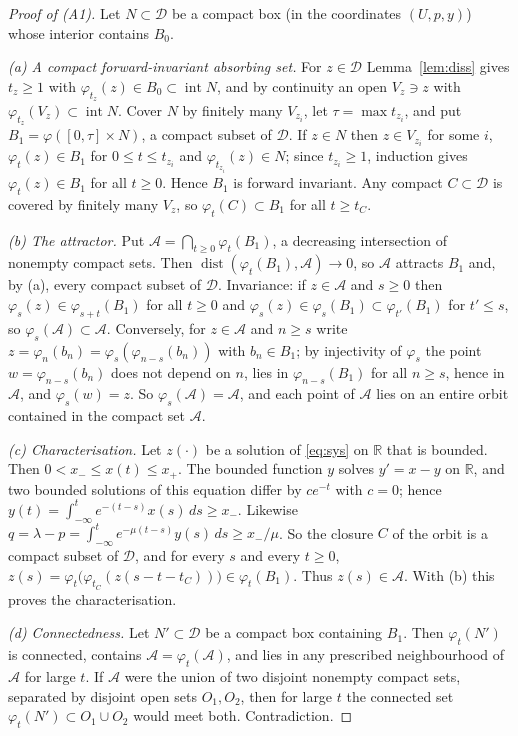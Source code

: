 \documentclass[11pt,a4paper]{article}
\numberwithin{equation}{section}
\theoremstyle{remark}\newtheorem{remark}[theorem]{Remark}
\newcommand{\R}{\mathbb R}
\newcommand{\cA}{\mathcal A}
\newcommand{\cD}{\mathcal D}
\DeclareMathOperator{\inter}{int}
\begin{document}
\begin{proof}[Proof of (A1)]
Let $N\subset\cD$ be a compact box (in the coordinates $(U,p,y)$) whose interior contains $B_0$.

\emph{(a) A compact forward-invariant absorbing set.} For $z\in\cD$ Lemma~\ref{lem:diss} gives $t_z\ge1$ with
$\varphi_{t_z}(z)\in B_0\subset\inter N$, and by continuity an open $V_z\ni z$ with
$\varphi_{t_z}(V_z)\subset\inter N$. Cover $N$ by finitely many $V_{z_i}$, let $\tau=\max t_{z_i}$, and put
$B_1=\varphi([0,\tau]\times N)$, a compact subset of $\cD$. If $z\in N$ then $z\in V_{z_i}$ for some $i$,
$\varphi_t(z)\in B_1$ for $0\le t\le t_{z_i}$ and $\varphi_{t_{z_i}}(z)\in N$; since $t_{z_i}\ge1$, induction gives
$\varphi_t(z)\in B_1$ for all $t\ge0$. Hence $B_1$ is forward invariant. Any compact $C\subset\cD$ is covered by
finitely many $V_z$, so $\varphi_t(C)\subset B_1$ for all $t\ge t_C$.

\emph{(b) The attractor.} Put $\cA=\bigcap_{t\ge0}\varphi_t(B_1)$, a decreasing intersection of nonempty compact
sets. Then $\operatorname{dist}(\varphi_t(B_1),\cA)\to0$, so $\cA$ attracts $B_1$ and, by (a), every compact subset
of $\cD$. Invariance: if $z\in\cA$ and $s\ge0$ then $\varphi_s(z)\in\varphi_{s+t}(B_1)$ for all $t\ge0$ and
$\varphi_s(z)\in\varphi_s(B_1)\subset\varphi_{t'}(B_1)$ for $t'\le s$, so $\varphi_s(\cA)\subset\cA$. Conversely,
for $z\in\cA$ and $n\ge s$ write $z=\varphi_n(b_n)=\varphi_s(\varphi_{n-s}(b_n))$ with $b_n\in B_1$; by injectivity
of $\varphi_s$ the point $w=\varphi_{n-s}(b_n)$ does not depend on $n$, lies in $\varphi_{n-s}(B_1)$ for all
$n\ge s$, hence in $\cA$, and $\varphi_s(w)=z$. So $\varphi_s(\cA)=\cA$, and each point of $\cA$ lies on an entire
orbit contained in the compact set $\cA$.

\emph{(c) Characterisation.} Let $z(\cdot)$ be a solution of \eqref{eq:sys} on $\R$ that is bounded. Then
$0<x_-\le x(t)\le x_+$. The bounded function $y$ solves $y'=x-y$ on $\R$, and two bounded solutions of this equation
differ by $ce^{-t}$ with $c=0$; hence $y(t)=\int_{-\infty}^te^{-(t-s)}x(s)\,ds\ge x_-$. Likewise
$q=\lambda-p=\int_{-\infty}^te^{-\mu(t-s)}y(s)\,ds\ge x_-/\mu$. So the closure $C$ of the orbit is a compact subset of
$\cD$, and for every $s$ and every $t\ge0$, $z(s)=\varphi_t\bigl(\varphi_{t_C}(z(s-t-t_C))\bigr)\in\varphi_t(B_1)$.
Thus $z(s)\in\cA$. With (b) this proves the characterisation.

\emph{(d) Connectedness.} Let $N'\subset\cD$ be a compact box containing $B_1$. Then $\varphi_t(N')$ is connected,
contains $\cA=\varphi_t(\cA)$, and lies in any prescribed neighbourhood of $\cA$ for large $t$. If $\cA$ were the
union of two disjoint nonempty compact sets, separated by disjoint open sets $O_1,O_2$, then for large $t$ the
connected set $\varphi_t(N')\subset O_1\cup O_2$ would meet both. Contradiction.
\end{proof}
\end{document}
